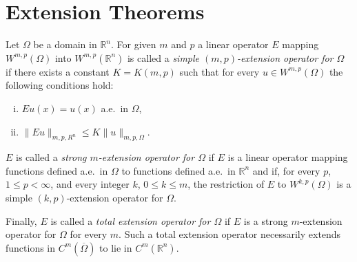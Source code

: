 \section{Extension Theorems}

\begin{para}
  Let $\Omega$ be a domain in $\mathbb{R}^n$. For given $m$ and $p$ a linear
  operator $E$ mapping $W^{m,p}(\Omega)$ into $W^{m,p}(\mathbb{R}^n)$ is called
  a \emph{simple $(m,p)$-extension operator for $\Omega$} if there exists a
  constant $K=K(m,p)$ such that for every $u\in W^{m,p}(\Omega)$ the following
  conditions hold:
  \begin{enumerate}[(i)]
    \item $Eu(x) = u(x)$ a.e.~in $\Omega$,
    \item $\|Eu\|_{m,p,R^n} \leq K \|u\|_{m,p,\Omega}$.
  \end{enumerate}
  $E$ is called a \emph{strong $m$-extension operator for $\Omega$} if $E$
  is a linear operator mapping functions defined a.e.~in $\Omega$ to functions
  defined a.e.~in $\mathbb{R}^n$ and if, for every $p$, $1\leq p<\infty$,
  and every integer $k$, $0\leq k\leq m$, the restriction of $E$ to
  $W^{k,p}(\Omega)$ is a simple $(k,p)$-extension operator for $\Omega$.

  Finally, $E$ is called a \emph{total extension operator for $\Omega$}
  if $E$ is a strong $m$-extension operator for $\Omega$ for every $m$.
  Such a total extension operator necessarily extends functions in
  $C^m(\overline{\Omega})$ to lie in $C^m(\mathbb{R}^n)$.
\end{para}


